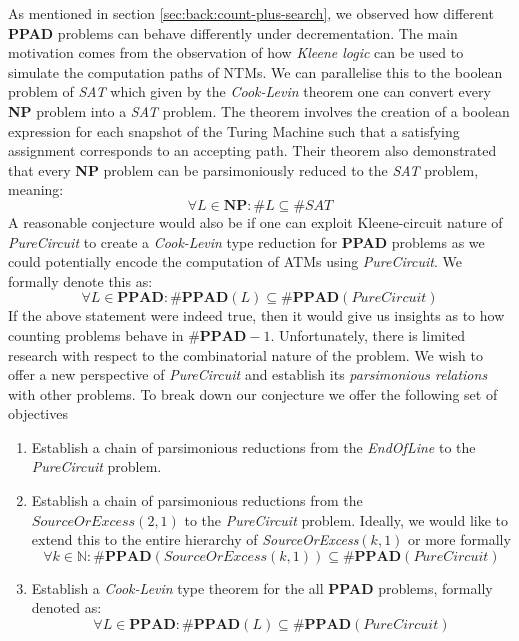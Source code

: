 As mentioned in section \ref{sec:back:count-plus-search}, we observed how different \textbf{PPAD} problems can behave differently under decrementation.
The main motivation comes from the observation of how \textit{Kleene logic} can be used to simulate the computation
paths of NTMs. We can parallelise this to the boolean problem of \textit{SAT} which
given by the \textit{Cook-Levin} theorem \cite{cook_ComplexityTheoremprovingProcedures_1971}
one can convert every \textbf{NP} problem into a \textit{SAT} problem.
The theorem involves the creation of a boolean expression for each snapshot of the
Turing Machine such that a satisfying assignment corresponds to an accepting path.
Their theorem also demonstrated that every \textbf{NP} problem can be parsimoniously reduced to the
\textit{SAT} problem, meaning:
$$
    \forall L \in \textbf{NP}: \#L \subseteq  \textit{\#SAT}
$$
A reasonable conjecture would also be if one can exploit Kleene-circuit nature of \textit{PureCircuit} to
create a \textit{Cook-Levin} type reduction for \textbf{PPAD} problems as we could potentially
encode the computation of ATMs using \textit{PureCircuit}. We formally denote this as:
$$
    \forall L \in \textbf{PPAD}: \textbf{\#PPAD}(L) \subseteq  \textbf{\#PPAD}(\textit{PureCircuit})
$$
If the above statement were indeed true, then it would give us insights as to how counting problems behave in $\textbf{\#PPAD}-1$.
Unfortunately, there is limited research with respect to the combinatorial
nature of the problem. We wish to offer a new perspective of \textit{PureCircuit}
and establish its \textit{parsimonious relations} with other problems.
To break down our conjecture we offer the following set of objectives

\begin{enumerate}
    \item Establish a chain of parsimonious reductions from the \textit{EndOfLine} to the \textit{PureCircuit} problem.
    \item Establish a chain of parsimonious reductions from the $\textit{SourceOrExcess}(2,1)$ to the \textit{PureCircuit} problem.
          Ideally, we would like to extend this to the entire hierarchy of \textit{SourceOrExcess}$(k,1)$ or more formally
          $$
              \forall k \in \mathbb{N}: \textbf{\#PPAD}(\textit{SourceOrExcess}(k,1)) \subseteq  \textbf{\#PPAD}(\textit{PureCircuit})
          $$

    \item Establish a \textit{Cook-Levin} type theorem for the all \textbf{PPAD} problems, formally denoted as:
          $$
              \forall L \in \textbf{PPAD}: \textbf{\#PPAD}(L) \subseteq  \textbf{\#PPAD}(\textit{PureCircuit})
          $$
\end{enumerate}

